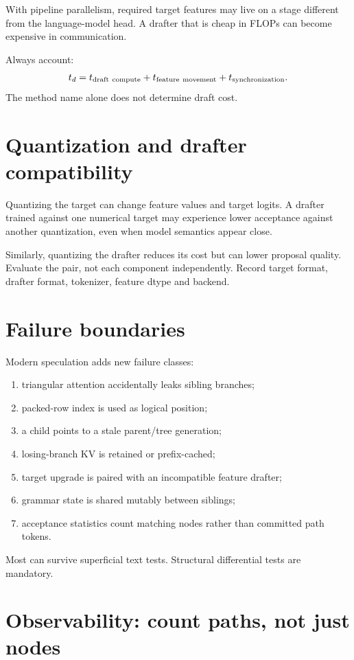 With pipeline parallelism, required target features may live on a stage different from
the language-model head. A drafter that is cheap in FLOPs can become expensive in
communication.

Always account:
\[
t_d=t_{\rm draft\ compute}+t_{\rm feature\ movement}+t_{\rm synchronization}.
\]
The method name alone does not determine draft cost.

\section{Quantization and drafter compatibility}

Quantizing the target can change feature values and target logits. A drafter trained
against one numerical target may experience lower acceptance against another
quantization, even when model semantics appear close.

Similarly, quantizing the drafter reduces its cost but can lower proposal quality.
Evaluate the pair, not each component independently. Record target format, drafter
format, tokenizer, feature dtype and backend.

\section{Failure boundaries}

Modern speculation adds new failure classes:
\begin{enumerate}
\item triangular attention accidentally leaks sibling branches;
\item packed-row index is used as logical position;
\item a child points to a stale parent/tree generation;
\item losing-branch KV is retained or prefix-cached;
\item target upgrade is paired with an incompatible feature drafter;
\item grammar state is shared mutably between siblings;
\item acceptance statistics count matching nodes rather than committed path tokens.
\end{enumerate}
Most can survive superficial text tests. Structural differential tests are mandatory.

\section{Observability: count paths, not just nodes}

